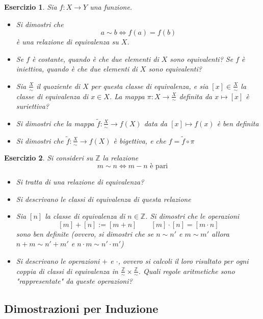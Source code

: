 \documentclass{article}
\newtheorem{es}{Esercizio}
\begin{document}
{\begin{es}
    Sia $f:X\to Y$ una funzione.\\
    \begin{itemize}
        \item Si dimostri che $$a\sim b\iff f(a)=f(b)$$ è una relazione di equivalenza su $X$.
        \item Se $f$ è costante, quando è che due elementi di $X$ sono equivalenti? Se $f$ è iniettiva, quando è che due elementi di $X$ sono equivalenti?
        \item Sia $\frac{X}{\sim}$ il quoziente di $X$ per questa classe di equivalenza, e sia $[x]\in \frac{X}{\sim}$ la classe di equivalenza di $x\in X$. La mappa $\pi:X\to \frac{X}{\sim}$ definita da $x\mapsto [x]$ è suriettiva?
        \item Si dimostri che la mappa $\tilde{f}:\frac{X}{\sim}\to f(X)$ data da $[x]\mapsto f(x)$ è ben definita
        \item Si dimostri che $\tilde{f}:\frac{X}{\sim}\to f(X)$ è bigettiva, e che $f=\tilde{f}\circ \pi$
    \end{itemize}
\end{es}



\begin{es}
    Si consideri su $\mathbb{Z}$ la relazione $$m\sim n\iff m-n\text{ è pari}$$
    \begin{itemize}
        \item Si tratta di una relazione di equivalenza?
        \item Si descrivano le classi di equivalenza di questa relazione
        \item Sia $[n]$ la classe di equivalenza di $n\in \mathbb{Z}$. Si dimostri che le operazioni 
        $$[m]+[n]:= [m+n]\qquad [m]\cdot [n]=[m\cdot n]$$
        sono ben definite (ovvero, si dimostri che se $n\sim n'$ e $m\sim m'$ allora $n+m\sim n'+m'$ e $n\cdot m\sim n'\cdot m'$)
        \item Si descrivano le operazioni $+$ e $\cdot$, ovvero si calcoli il loro risultato per ogni coppia di classi di equivalenza in $\frac{\mathbb{Z}}{\sim}\times \frac{\mathbb{Z}}{\sim}$. Quali regole aritmetiche sono "rappresentate" da queste operazioni?
    \end{itemize}
\end{es}

\subsection{Dimostrazioni per Induzione}


}
\end{document}
